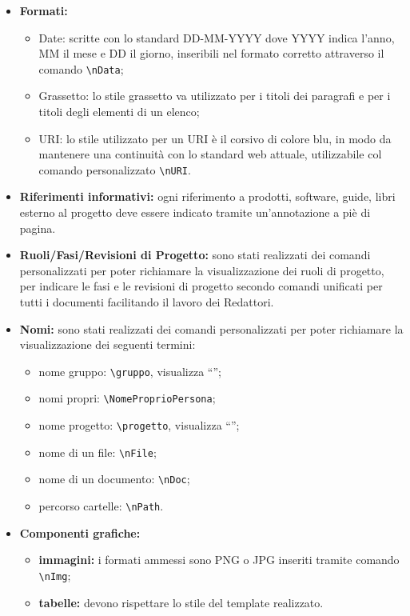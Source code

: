 \documentclass[NormeDiProgetto.tex]{subfiles}
\begin{document}
\begin{itemize}
			\item \textbf{Formati:}
			\begin{itemize}
				\item Date: scritte con lo standard DD-MM-YYYY dove YYYY indica l'anno, MM il mese e DD il giorno, inseribili nel formato corretto attraverso il comando \texttt{\textbackslash nData};
				\item Grassetto: lo stile grassetto va utilizzato per i titoli dei paragrafi e per i titoli degli elementi di un elenco; 
				\item URI: lo stile utilizzato per un URI è il corsivo di colore blu, in modo da mantenere una continuità con lo standard web attuale, utilizzabile col comando personalizzato  \texttt{\textbackslash nURI}.
			\end{itemize}
			
			\item \textbf{Riferimenti informativi:}
			ogni riferimento a prodotti, software, guide, libri esterno al progetto deve essere indicato tramite un'annotazione a piè di pagina.			
			
			\item \textbf{Ruoli/Fasi/Revisioni di Progetto:} sono stati realizzati dei comandi personalizzati per poter richiamare la visualizzazione dei ruoli di progetto, per indicare le fasi e le revisioni di progetto secondo comandi unificati per tutti i documenti facilitando il lavoro dei Redattori.
			
			\item \textbf{Nomi:} sono stati realizzati dei comandi personalizzati per poter richiamare la visualizzazione dei seguenti termini:
			\begin{itemize}
				\item nome gruppo: \texttt{\textbackslash gruppo}, visualizza \textquotedblleft \gruppo\textquotedblright;
				\item nomi propri: \texttt{\textbackslash NomeProprioPersona};
				\item nome progetto: \texttt{\textbackslash progetto}, visualizza \textquotedblleft \progetto\textquotedblright;
				\item nome di un file: \texttt{\textbackslash nFile};
				\item nome di un documento: \texttt{\textbackslash nDoc};
				\item percorso cartelle: \texttt{\textbackslash nPath}.
			\end{itemize}
		
			\item \textbf{Componenti grafiche:}
			 \begin{itemize}
			 	\item \textbf{immagini:} i formati ammessi sono PNG o JPG inseriti tramite comando \texttt{\textbackslash nImg}; 
			 	\item \textbf{tabelle:} devono rispettare lo stile del template realizzato.
			 \end{itemize}
			
		\end{itemize}
	
\end{document}
